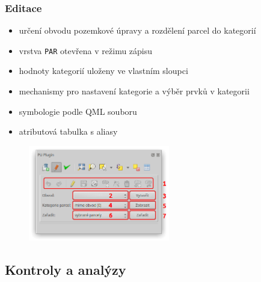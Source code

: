 \documentclass{beamer}
\begin{document}
\begin{frame}

\frametitle{Editace}

\begin{itemize}
	\item určení obvodu pozemkové úpravy a rozdělení parcel do kategorií
	\item vrstva \texttt{PAR} otevřena v režimu zápisu
	\item hodnoty kategorií uloženy ve vlastním sloupci
	\item mechanismy pro nastavení kategorie a výběr prvků v kategorii
	\item symbologie podle QML souboru
	\item atributová tabulka s aliasy
\end{itemize}


\begin{figure}[ht]
	\includegraphics[width=0.55\textwidth]{pictures/editace_gui.png}
\end{figure}

\end{frame}


\subsection{Kontroly a analýzy}
\end{document}
